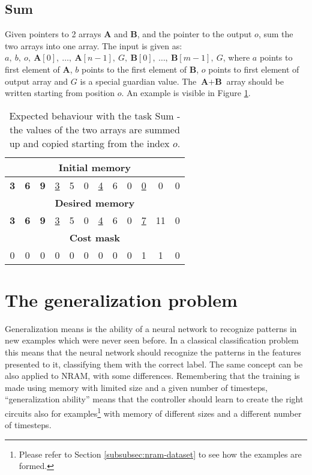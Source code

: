 \subsection{Sum}
Given pointers to 2 arrays \textbf{A} and \textbf{B}, and the pointer to the output $o$, sum the two arrays into one array. The input is given as: $a,\ b,\ o,\ \textbf{A}[0],\ \dots,\ \textbf{A}[n-1],\ G,\ \textbf{B}[0],\ \dots,\ \textbf{B}[m-1],\ G$, where $a$ points to first element of \textbf{A}, $b$ points to the first element of \textbf{B}, $o$ points to first element of output array and $G$ is a special guardian value. The $\textbf{A}+\textbf{B}$ array should be written starting from position $o$. An example is visible in Figure \ref{fig:sum-example}.
\begin{table}[h!]
	\centering
	\begin{tabular}{|c|c|c|c|c|c|c|c|c|c|c|c|}
		\hline
		\multicolumn{12}{|c|}{\textbf{Initial memory}} \\ \hline
		\textbf{3} & \textbf{6} & \textbf{9} & \underline{3} & 5 & 0 & \underline{4} & 6 & 0 & \underline{0} & 0 & 0 \\ \hline\hline\hline
		\multicolumn{12}{|c|}{\textbf{Desired memory}} \\ \hline
		\textbf{3} & \textbf{6} & \textbf{9} & \underline{3} & 5 & 0 & \underline{4} & 6 & 0 & \underline{7} & 11 & 0 \\ \hline\hline\hline
		\multicolumn{12}{|c|}{\textbf{Cost mask}} \\ \hline
		0 & 0 & 0 & 0 & 0 & 0 & 0 & 0 & 0 & 1 & 1 & 0 \\ \hline
	\end{tabular}
	\caption{Expected behaviour with the task Sum - the values of the two arrays are summed up and copied starting from the index $o$.}
	\label{fig:sum-example}
\end{table}
\FloatBarrier
\fi
\section{The generalization problem}
Generalization means is the ability of a neural network to recognize patterns in new examples which were never seen before. In a classical classification problem this means that the neural network should recognize the patterns in the features presented to it, classifying them with the correct label. The same concept can be also applied to NRAM, with some differences. Remembering that the training is made using memory with limited size and a given number of timesteps, ``generalization ability'' means that the controller should learn to create the right circuits also for examples\footnote{Please refer to Section \ref{subsubsec:nram-dataset} to see how the examples are formed.} with memory of different sizes and  a different number of timesteps.

